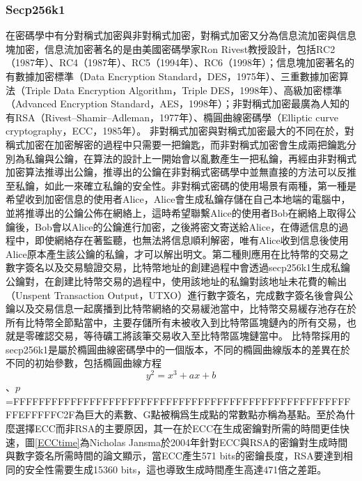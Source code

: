 			\subsubsection{Secp256k1}
			在密碼學中有分對稱式加密與非對稱式加密，對稱式加密又分為信息流加密與信息塊加密，信息流加密著名的是由美國密碼學家Ron Rivest教授設計，包括RC2（1987年）\supercite{OnthedesignandsecurityofRC2}、RC4（1987年）\supercite{Rc4}、RC5（1994年）\supercite{TheRC5encryptionalgorithm}、RC6（1998年）\supercite{TheRC6blockcipher.v1.1August201998}；信息塊加密著名的有數據加密標準（Data Encryption Standard，DES，1975年）\supercite{Dataencryptionstandard}、三重數據加密算法（Triple Data Encryption Algorithm，Triple DES，1998年）\supercite{TrippleDataEncryptionAlgorithmModesofOperation}、高級加密標準（Advanced Encryption Standard，AES，1998年）\supercite{ThedesignofRijndael:AES-theadvancedencryptionstandard}；非對稱式加密最廣為人知的有RSA（Rivest–Shamir–Adleman，1977年）\supercite{Cryptographiccommunicationssystemandmethod}、橢圓曲線密碼學（Elliptic curve cryptography，ECC，1985年）\supercite{Ellipticcurvecryptosystems}。
			非對稱式加密與對稱式加密最大的不同在於，對稱式加密在加密解密的過程中只需要一把鑰匙，而非對稱式加密會生成兩把鑰匙分別為私鑰與公鑰，在算法的設計上一開始會以亂數產生一把私鑰，再經由非對稱式加密算法推導出公鑰，推導出的公鑰在非對稱式密碼學中並無直接的方法可以反推至私鑰，如此一來確立私鑰的安全性。非對稱式密碼的使用場景有兩種，第一種是希望收到加密信息的使用者Alice，Alice會生成私鑰存儲在自己本地端的電腦中，並將推導出的公鑰公佈在網絡上，這時希望聯繫Alice的使用者Bob在網絡上取得公鑰後，Bob會以Alice的公鑰進行加密，之後將密文寄送給Alice，在傳遞信息的過程中，即使網絡存在著監聽，也無法將信息順利解密，唯有Alice收到信息後使用Alice原本產生該公鑰的私鑰，才可以解出明文。第二種則應用在比特幣的交易之數字簽名以及交易驗證交易，比特幣地址的創建過程中會透過secp256k1生成私鑰公鑰對，在創建比特幣交易的過程中，使用該地址的私鑰對該地址未花費的輸出（Unspent Transaction Output，UTXO）進行數字簽名，完成數字簽名後會與公鑰以及交易信息一起廣播到比特幣網絡的交易緩池當中，比特幣交易緩存池存在於所有比特幣全節點當中，主要存儲所有未被收入到比特幣區塊鏈內的所有交易，也就是零確認交易，等待礦工將該筆交易收入至比特幣區塊鏈當中。
			比特幣採用的secp256k1是屬於橢圓曲線密碼學中的一個版本，不同的橢圓曲線版本的差異在於不同的初始參數，包括橢圓曲線方程$$y^2=x^3+ax+b$$、$p$=FFFFFFFFFFFFFFFFFFFFFFFFFFFFFFFFFFFFFFFFFFFFFFFFFFFFFFFEFFFFFC2F為巨大的素數、G點被稱爲⽣成點的常數點亦稱為基點。至於為什麼選擇ECC而非RSA的主要原因，其一在於ECC在生成密鑰對所需的時間更佳快速，圖\ref{ECCtime}為Nicholas Jansma於2004年針對ECC與RSA的密鑰對生成時間與數字簽名所需時間的論文\supercite{Performancecomparisonofellipticcurveandrsadigitalsignatures}顯示，當ECC產生571 bits的密鑰長度，RSA要達到相同的安全性需要生成15360 bits，這也導致生成時間產生高達471倍之差距。
			
